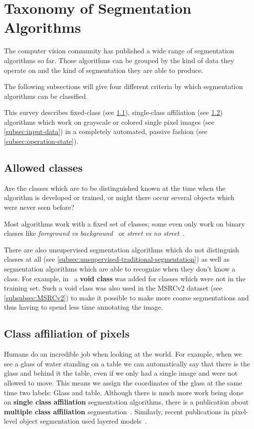 
\section{Taxonomy of Segmentation Algorithms}\label{sec:taxonomy}
The computer vision community has published a wide range of segmentation
algorithms so far. Those algorithms can be grouped by the kind of data they
operate on and the kind of segmentation they are able to produce.

The following subsections will give four different criteria by which
segmentation algorithms can be classified.

This survey describes fixed-class (see \cref{subsec:allowed-classes}),
single-class affiliation (see \cref{subsec:class-affiliation}) algorithms which
work on grayscale or colored single pixel images (see \cref{subsec:input-data})
in a completely automated, passive fashion (see \cref{subsec:operation-state}).

\subsection{Allowed classes}\label{subsec:allowed-classes}
Are the classes which are to be distinguished known at the time when the
algorithm is developed or trained, or might there occur several objects which
were never seen before?

Most algorithms work with a fixed set of classes; some even only work on binary
classes like \textit{foreground vs
background}~\cite{4228537,carreira2010constrained} or \textit{street vs no
street}~\cite{bittel2015pixel}.

There are also unsupervised segmentation algorithms which do not distinguish
classes at all (see \cref{subsec:unsupervised-traditional-segmentation}) as
well as segmentation algorithms which are able to recognize when they don't
know a class. For example, in~\cite{gould2008multi} a
\textbf{void class} was added for classes which were not in the training set.
Such a void class was also used in the MSRCv2 dataset (see
\cref{subsubsec:MSRCv2}) to make it possible to make more coarse segmentations
and thus having to spend less time annotating the image.


\subsection{Class affiliation of pixels}\label{subsec:class-affiliation}
Humans do an incredible job when looking at the world. For example, when we
see a glass of water standing on a table we can automatically say that there is
the glass and behind it the table, even if we only had a single image and were
not allowed to move. This means we assign the coordinates of the glass at the
same time two labels: Glass and table. Although there is much more work being
done on \textbf{single class affiliation} segmentation algorithms, there is a
publication about \textbf{multiple class affiliation}
segmentation~\cite{levin2008spectral}. Similarly, recent publications in
pixel-level object segmentation used layered models~\cite{yang2012layered}.

